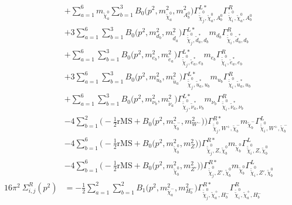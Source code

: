 \begin{itemize}
\begin{align}
 &+\sum_{a=1}^{6}m_{\tilde{\chi}^0_{{a}}} \sum_{b=1}^{3}{B_0\Big(p^{2},m^2_{\tilde{\chi}^0_{{a}}},m^2_{A^0_{{b}}}\Big)} {\Gamma^{L*}_{\check{\tilde{\chi}}^0_{{j}},\tilde{\chi}^0_{{a}},A^0_{{b}}}} {\Gamma^R_{\check{\tilde{\chi}}^0_{{i}},\tilde{\chi}^0_{{a}},A^0_{{b}}}}  \nonumber \\ 
 &+3 \sum_{a=1}^{6}\sum_{b=1}^{3}{B_0\Big(p^{2},m^2_{d_{{b}}},m^2_{\tilde{d}_{{a}}}\Big)} {\Gamma^{L*}_{\check{\tilde{\chi}}^0_{{j}},\tilde{d}^*_{{a}},d_{{b}}}} m_{d_{{b}}} {\Gamma^R_{\check{\tilde{\chi}}^0_{{i}},\tilde{d}^*_{{a}},d_{{b}}}}  \nonumber \\ 
 &+\sum_{a=1}^{6}\sum_{b=1}^{3}{B_0\Big(p^{2},m^2_{e_{{b}}},m^2_{\tilde{e}_{{a}}}\Big)} {\Gamma^{L*}_{\check{\tilde{\chi}}^0_{{j}},\tilde{e}^*_{{a}},e_{{b}}}} m_{e_{{b}}} {\Gamma^R_{\check{\tilde{\chi}}^0_{{i}},\tilde{e}^*_{{a}},e_{{b}}}} \nonumber \\ 
 &+3 \sum_{a=1}^{6}\sum_{b=1}^{3}{B_0\Big(p^{2},m^2_{u_{{b}}},m^2_{\tilde{u}_{{a}}}\Big)} {\Gamma^{L*}_{\check{\tilde{\chi}}^0_{{j}},\tilde{u}^*_{{a}},u_{{b}}}} m_{u_{{b}}} {\Gamma^R_{\check{\tilde{\chi}}^0_{{i}},\tilde{u}^*_{{a}},u_{{b}}}}  \nonumber \\ 
 &+\sum_{a=1}^{6}\sum_{b=1}^{3}{B_0\Big(p^{2},m^2_{\nu_{{b}}},m^2_{\tilde{\nu}_{{a}}}\Big)} {\Gamma^{L*}_{\check{\tilde{\chi}}^0_{{j}},\tilde{\nu}^*_{{a}},\nu_{{b}}}} m_{\nu_{{b}}} {\Gamma^R_{\check{\tilde{\chi}}^0_{{i}},\tilde{\nu}^*_{{a}},\nu_{{b}}}} \nonumber \\ 
 &-4 \sum_{b=1}^{2}\Big(-\frac{1}{2} \text{rMS}  + {B_0\Big(p^{2},m^2_{\tilde{\chi}^-_{{b}}},m^2_{W^-}\Big)}\Big){\Gamma^{R*}_{\check{\tilde{\chi}}^0_{{j}},W^+,\tilde{\chi}^-_{{b}}}} m_{\tilde{\chi}^-_{{b}}} {\Gamma^L_{\check{\tilde{\chi}}^0_{{i}},W^+,\tilde{\chi}^-_{{b}}}}  \nonumber \\ 
 &-4 \sum_{b=1}^{6}\Big(-\frac{1}{2} \text{rMS}  + {B_0\Big(p^{2},m^2_{\tilde{\chi}^0_{{b}}},m^2_{Z}\Big)}\Big){\Gamma^{R*}_{\check{\tilde{\chi}}^0_{{j}},Z,\tilde{\chi}^0_{{b}}}} m_{\tilde{\chi}^0_{{b}}} {\Gamma^L_{\check{\tilde{\chi}}^0_{{i}},Z,\tilde{\chi}^0_{{b}}}}  \nonumber \\ 
 &-4 \sum_{b=1}^{6}\Big(-\frac{1}{2} \text{rMS}  + {B_0\Big(p^{2},m^2_{\tilde{\chi}^0_{{b}}},m^2_{{Z'}}\Big)}\Big){\Gamma^{R*}_{\check{\tilde{\chi}}^0_{{j}},{Z'},\tilde{\chi}^0_{{b}}}} m_{\tilde{\chi}^0_{{b}}} {\Gamma^L_{\check{\tilde{\chi}}^0_{{i}},{Z'},\tilde{\chi}^0_{{b}}}}  \\ 
16\pi^2 \ \Sigma^R_{i,j}(p^2) &= -\frac{1}{2} \sum_{a=1}^{2}\sum_{b=1}^{2}{B_1\Big(p^{2},m^2_{\tilde{\chi}^-_{{a}}},m^2_{H^-_{{b}}}\Big)} {\Gamma^{R*}_{\check{\tilde{\chi}}^0_{{j}},\tilde{\chi}^+_{{a}},H^-_{{b}}}} {\Gamma^R_{\check{\tilde{\chi}}^0_{{i}},\tilde{\chi}^+_{{a}},H^-_{{b}}}}  \nonumber \\ 

\end{align}
\end{itemize}

